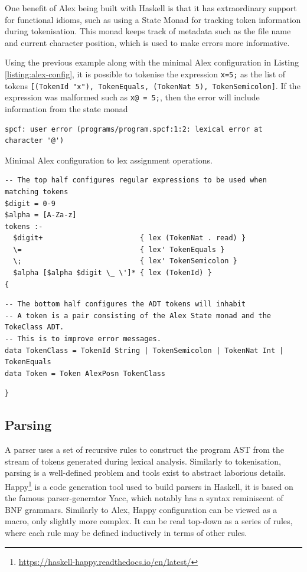 \documentclass[12pt,a4paper]{report}
\theoremstyle{definition}
\theoremstyle{definition}
\theoremstyle{remark}
\begin{document}
One benefit of Alex being built with Haskell is that it has extraordinary support for functional idioms, such as using a State Monad for tracking token information during tokenisation. This monad keeps track of metadata such as the file name and current character position, which is used to make errors more informative. 

Using the previous example along with the minimal Alex configuration in Listing \ref{listing:alex-config}, it is possible to tokenise the expression \lstinline{x=5;} as the list of tokens \lstinline{[(TokenId "x"), TokenEquals, (TokenNat 5), TokenSemicolon]}. If the expression was malformed such as \lstinline{x@ = 5;}, then the error will include information from the state monad
\begin{verbatim}
spcf: user error (programs/program.spcf:1:2: lexical error at character '@')
\end{verbatim}

\begin{listing}
\caption{Minimal Alex configuration to lex assignment operations.}
\begin{verbatim}
-- The top half configures regular expressions to be used when matching tokens
$digit = 0-9
$alpha = [A-Za-z]
tokens :-
  $digit+                       { lex (TokenNat . read) }
  \=                            { lex' TokenEquals }
  \;                            { lex' TokenSemicolon }
  $alpha [$alpha $digit \_ \']* { lex (TokenId) }
{
\end{verbatim}
\label{listing:alex-config}
\begin{verbatim}
-- The bottom half configures the ADT tokens will inhabit
-- A token is a pair consisting of the Alex State monad and the TokeClass ADT.
-- This is to improve error messages.
data TokenClass = TokenId String | TokenSemicolon | TokenNat Int | TokenEquals
data Token = Token AlexPosn TokenClass
\end{verbatim}
\begin{verbatim}
}
\end{verbatim}
\end{listing}

\subsection{Parsing} 
A parser uses a set of recursive rules to construct the program AST from the stream of tokens generated during lexical analysis. Similarly to tokenisation, parsing is a well-defined problem and tools exist to abstract laborious details. Happy\footnote{\url{https://haskell-happy.readthedocs.io/en/latest/}} is a code generation tool used to build parsers in Haskell, it is based on the famous parser-generator Yacc, which notably has a syntax reminiscent of BNF grammars. Similarly to Alex, Happy configuration can be viewed as a macro, only slightly more complex. It can be read top-down as a series of rules, where each rule may be defined inductively in terms of other rules. 
\end{document}
